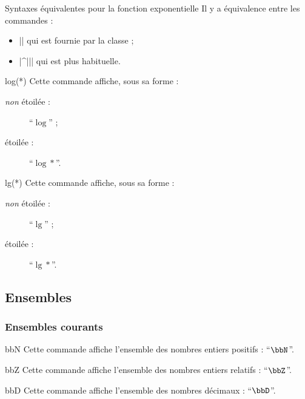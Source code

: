 \documentclass[english,nolocaltoc]{nwejmart}
\newtheorem[style=definition]{fait}
\newtheorem[title=expérience]{experience}
\newtheorem[title-plural=anneaux]{anneau}
\newtheorem[title=idéal,title-plural=idéaux]{ideal}
\begin{document}
\begin{dbremark}{Syntaxes équivalentes pour la fonction exponentielle}{}
  Il y a équivalence entre les commandes :
  \begin{itemize}
  \item || qui est fournie par la classe ;
  \item |\E^{||}| qui est plus habituelle.
\end{itemize}
\end{dbremark}

\begin{docCommand}{log(*)}{}
  Cette commande affiche, sous sa forme :
  \begin{description}
  \item[\emph{non} étoilée :] \enquote{$\log$} ;
  \item[étoilée :] \enquote{$\log*$}.
  \end{description}
\end{docCommand}

\begin{docCommand}{lg(*)}{}
  Cette commande affiche, sous sa forme :
  \begin{description}
  \item[\emph{non} étoilée :] \enquote{$\lg$} ;
  \item[étoilée :] \enquote{$\lg*$}.
  \end{description}
\end{docCommand}

\subsection{Ensembles}

\subsubsection{Ensembles courants}

\begin{docCommand}{bbN}{}
  Cette commande affiche l'ensemble des nombres entiers positifs :
  \enquote{$\bbN$}.
\end{docCommand}

\begin{docCommand}{bbZ}{}
  Cette commande affiche l'ensemble des nombres entiers relatifs :
  \enquote{$\bbZ$}.
\end{docCommand}

\begin{docCommand}{bbD}{}
  Cette commande affiche l'ensemble des nombres décimaux : \enquote{$\bbD$}.
\end{docCommand}
\end{document}
